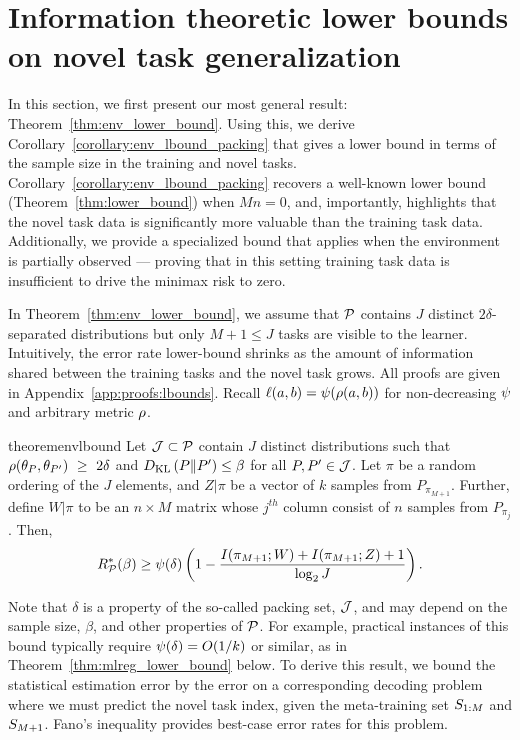 
\section{Information theoretic lower bounds on novel task generalization}
\label{sec:lbounds}
\vspace{-0.1in}

In this section, we first present our most general result: Theorem~\ref{thm:env_lower_bound}. Using this, we derive Corollary~\ref{corollary:env_lbound_packing} that gives a lower bound in terms of the sample size in the training and novel tasks. Corollary~\ref{corollary:env_lbound_packing} recovers a well-known \iid lower bound (Theorem~\ref{thm:lower_bound}) when $Mn=0$, and, importantly, highlights that the novel task data is significantly more valuable than the training task data. Additionally, we provide a specialized bound that applies when the environment is partially observed --- proving that in this setting training task data is insufficient to drive the minimax risk to zero.

In Theorem~\ref{thm:env_lower_bound}, we assume that $\mathcal{P}$ contains $J$ distinct $2\delta$-separated distributions but only $M+1 \leq J$ tasks are visible to the learner. Intuitively, the error rate lower-bound shrinks as the amount of information shared between the training tasks and the novel task grows.
All proofs are given in Appendix~\ref{app:proofs:lbounds}. Recall $\ell(a,b) = \psi(\rho(a, b))$ for non-decreasing $\psi$ and arbitrary metric $\rho$.

\begin{restatable}{theorem}{envlbound}\label{thm:env_lower_bound}
Let $\mathcal{J} \subset \mathcal{P}$ contain $J$ distinct distributions such that $\rho(\theta_{P}, \theta_{P'})~\geq~2\delta$ and $D_{\mathrm{KL}}\left(P\Vert P'\right) \leq \beta$ for all $P,P' \in \mathcal{J}$. 
Let $\pi$ be a random ordering of the $J$ elements, and $Z|\pi$ be a vector of $k$ \iid samples from $P_{\pi_{M+1}}$.
Further, define $W|\pi$ to be an $n \times M$ matrix whose $j^{th}$ column consist of $n$ \iid samples from $P_{\pi_j}$. Then,
\begin{align*}
R^*_{\mathcal{P}}(\beta) \geq
\psi(\delta)\left(1 - \dfrac{I(\pi_{M+1}; W) + I(\pi_{M+1};Z) + 1}{\log_2 J}\right).
\end{align*}
\end{restatable}
Note that $\delta$ is a property of the so-called packing set, $\mathcal{J}$, and may depend on the sample size, $\beta$, and other properties of $\mathcal{P}$. For example, practical instances of this bound typically require $\psi(\delta) = O(1/k)$ or similar, as in Theorem~\ref{thm:mlreg_lower_bound} below.
To derive this result, we bound the statistical estimation error by the error on a corresponding decoding problem where we must predict the novel task index, given the meta-training set $S_{1:M}$ and $S_{M+1}$. Fano's inequality provides best-case error rates for this problem.

